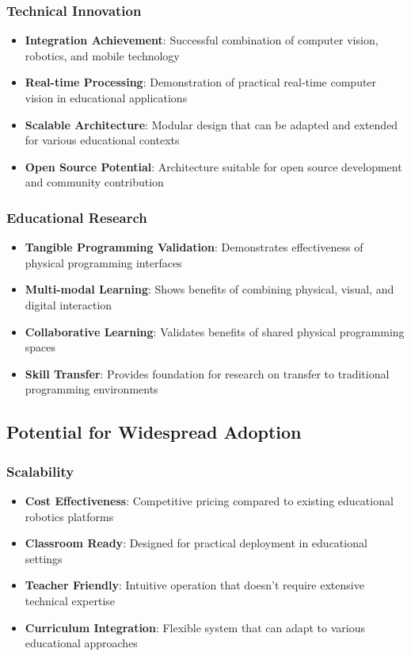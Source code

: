 \subsubsection{Technical Innovation}
\begin{itemize}
    \item \textbf{Integration Achievement}: Successful combination of computer vision, robotics, and mobile technology
    \item \textbf{Real-time Processing}: Demonstration of practical real-time computer vision in educational applications
    \item \textbf{Scalable Architecture}: Modular design that can be adapted and extended for various educational contexts
    \item \textbf{Open Source Potential}: Architecture suitable for open source development and community contribution
\end{itemize}

\subsubsection{Educational Research}
\begin{itemize}
    \item \textbf{Tangible Programming Validation}: Demonstrates effectiveness of physical programming interfaces
    \item \textbf{Multi-modal Learning}: Shows benefits of combining physical, visual, and digital interaction
    \item \textbf{Collaborative Learning}: Validates benefits of shared physical programming spaces
    \item \textbf{Skill Transfer}: Provides foundation for research on transfer to traditional programming environments
\end{itemize}

\subsection{Potential for Widespread Adoption}

\subsubsection{Scalability}
\begin{itemize}
    \item \textbf{Cost Effectiveness}: Competitive pricing compared to existing educational robotics platforms
    \item \textbf{Classroom Ready}: Designed for practical deployment in educational settings
    \item \textbf{Teacher Friendly}: Intuitive operation that doesn't require extensive technical expertise
    \item \textbf{Curriculum Integration}: Flexible system that can adapt to various educational approaches
\end{itemize}


